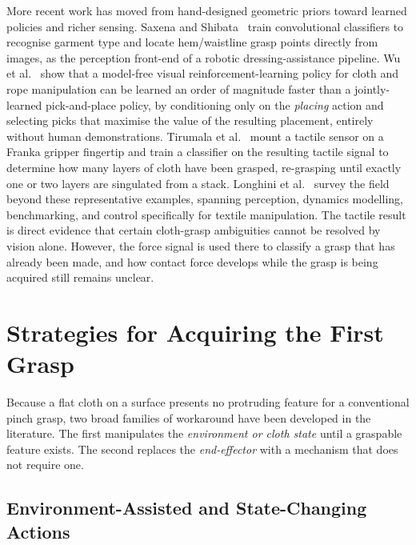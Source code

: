 More recent work has moved from hand-designed geometric priors toward
learned policies and richer sensing. Saxena and
Shibata~\cite{saxena2019garment} train convolutional classifiers to
recognise garment type and locate hem/waistline grasp points directly from
images, as the perception front-end of a robotic dressing-assistance
pipeline. Wu et al.~\cite{wu2020learning} show that a model-free visual
reinforcement-learning policy for cloth and rope manipulation can be
learned an order of magnitude faster than a jointly-learned pick-and-place
policy, by conditioning only on the \emph{placing} action and selecting
picks that maximise the value of the resulting placement, entirely without
human demonstrations. Tirumala et al.~\cite{tirumala2022singulate} mount a
tactile sensor on a Franka gripper fingertip and train a classifier on the
resulting tactile signal to determine how many layers of cloth have been
grasped, re-grasping until exactly one or two layers are singulated from a
stack. Longhini et al.~\cite{longhini2025unfolding} survey the field
beyond these representative examples, spanning perception, dynamics
modelling, benchmarking, and control specifically for textile
manipulation. The tactile result is direct evidence that certain
cloth-grasp ambiguities cannot be resolved by vision alone. However, the
force signal is used there to classify a grasp that has already been made,
and how contact force develops while the grasp is being acquired still
remains unclear.

\section{Strategies for Acquiring the First Grasp}
\label{sec:first-grasp-strategies}

Because a flat cloth on a surface presents no protruding feature for a
conventional pinch grasp, two broad families of workaround have been
developed in the literature. The first manipulates the \emph{environment
or cloth state} until a graspable feature exists. The second replaces the
\emph{end-effector} with a mechanism that does not require one.

\subsection{Environment-Assisted and State-Changing Actions}

